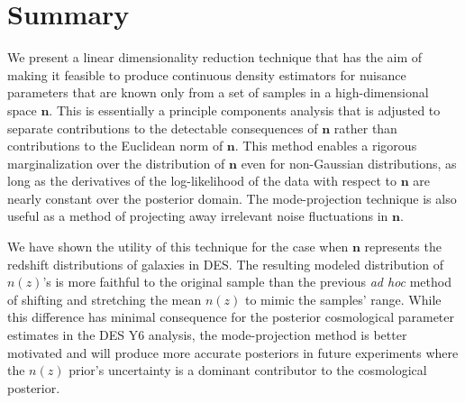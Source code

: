 \documentclass[linenumbers, onecolumn]{aastex7}
\newcommand{\vecn}{\ensuremath{\mathbf{n}}}
\begin{document}
\section{Summary}
  We present a linear dimensionality reduction technique that has the
  aim of making it feasible to produce continuous density estimators
  for nuisance parameters that are known only from a set of samples in
  a high-dimensional space $\vecn.$  This is essentially a principle
  components analysis that is adjusted to separate contributions to
  the detectable consequences of $\vecn$ rather than contributions to
  the Euclidean norm of $\vecn.$   This method enables a rigorous
  marginalization over the distribution of $\vecn$ even for
  non-Gaussian distributions, as long as the derivatives of the
  log-likelihood of the data with respect to $\vecn$ are nearly
  constant over the posterior domain.  The mode-projection technique
  is also useful as a method of projecting away irrelevant
  noise fluctuations in $\vecn.$

  We have shown the utility of this technique for the case when
  $\vecn$ represents the redshift distributions of galaxies in DES.
  The resulting modeled distribution of $n(z)$'s is more faithful to
  the original sample than the previous \textit{ad hoc} method of
  shifting and stretching the mean $n(z)$ to mimic the samples'
  range.  While this difference has minimal consequence for the
  posterior cosmological parameter estimates in the DES Y6 analysis,
  the mode-projection method is better motivated and will produce more
  accurate posteriors in future experiments where the $n(z)$
  prior's uncertainty is a dominant contributor to the cosmological posterior.
\end{document}
